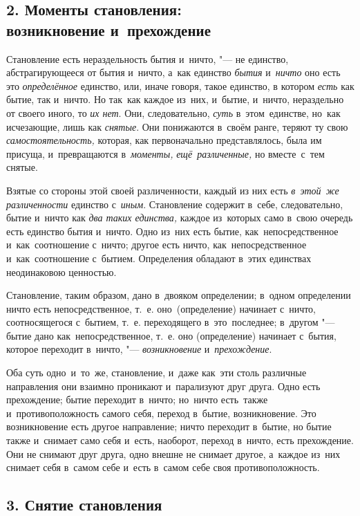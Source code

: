 \subsection%
[2. Моменты становления: возникновение и~прехождение]%
{2. Моменты становления:\\возникновение и~прехождение}

Становление есть нераздельность бытия и~ничто, "--- не единство,
абстрагирующееся от бытия и~ничто, а~как единство {\em бытия} и~{\em ничто} оно
есть это {\em определённое} единство, или, иначе говоря, такое единство, в
котором {\em есть} как бытие, так и~ничто. Но так~как каждое из~них, и~бытие,
и~ничто, нераздельно от своего иного, то {\em их нет}. Они, следовательно,
{\em суть} в~этом~единстве, но~как исчезающие, лишь как {\em снятые}. Они
понижаются в~своём ранге, теряют ту свою {\em самостоятельность,} которая, как
первоначально представлялось, была им присуща, и~превращаются в~{\em моменты,}
{\em ещё~различенные,} но вместе~с~тем снятые.

Взятые со стороны этой своей различенности, каждый из них есть
{\em в~этой~же различенности} единство с~{\em иным}. Становление содержит
в~себе, следовательно, бытие и~ничто как {\em два таких единства,} каждое из~которых
само в~свою очередь есть единство бытия и~ничто. Одно из~них есть бытие,
как~непосредственное и~как~соотношение с~ничто; другое есть ничто,
как~непосредственное и~как~соотношение с~бытием. Определения обладают в~этих
единствах неодинаковою ценностью.

Становление, таким образом, дано в~двояком определении; в~одном определении
ничто есть непосредственное, т.~е. оно~(определение) начинает с~ничто,
соотносящегося с~бытием, т.~е. переходящего в~это~последнее; в~другом "---
бытие дано как~непосредственное, т.~е. оно (определение) начинает с~бытия,
которое переходит в~ничто, "--- {\em возникновение} и~{\em прехождение}.

Оба суть одно~и~то~же, становление, и~даже как~эти столь различные направления
они взаимно проникают и~парализуют друг друга. Одно есть прехождение; бытие
переходит в~ничто; но~ничто есть~также и~противоположность самого себя, переход
в~бытие, возникновение. Это возникновение есть другое направление; ничто
переходит в~бытие, но бытие также и~снимает само себя и~есть, наоборот, переход
в~ничто, есть прехождение. Они не снимают друг друга, одно внешне не снимает
другое, а~каждое из~них снимает себя в~самом себе и~есть в~самом себе своя
противоположность.

\subsection[3. Снятие становления]{3. Снятие становления}

